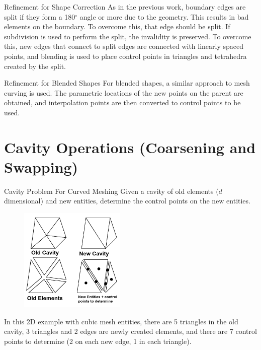 \documentclass[12pt]{beamer}
\newcommand{\spa}{\vspace{0.5cm}\newline}
\begin{document}
\begin{frame}{Refinement for Shape Correction}
As in the previous work, boundary edges are split if they form a 180$^\circ$ angle or more due to the geometry. This results in bad elements on the boundary. To overcome this, that edge should be split. If subdivision is used to perform the split, the invalidity is preserved. \spa To overcome this, new edges that connect to split edges are connected with linearly spaced points, and blending is used to place control points in triangles and tetrahedra created by the split.

\end{frame}
\begin{frame}{Refinement for Blended Shapes}
For blended shapes, a similar approach to mesh curving is used. The parametric locations of the new points on the parent are obtained, and interpolation points are then converted to control points to be used. 

\end{frame}
\section{Cavity Operations (Coarsening and Swapping)}
\begin{frame}{Cavity Problem For Curved Meshing}
Given a cavity of old elements ($d$ dimensional) and new entities, determine the control points on the new entities.
\begin{figure}
  \centering
  \includegraphics[width=0.45\textwidth]{bezier_images/cavity2.png} 
\end{figure}
In this 2D example with cubic mesh entities, there are 5 triangles in the old cavity, 3 triangles and 2 edges are newly created elements, and there are 7 control points to determine (2 on each new edge, 1 in each triangle).
\end{frame}
\end{document}
